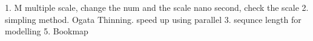 1. M multiple scale, change the num 
and the scale nano second, check the scale
2. simpling method. Ogata Thinning. speed up using parallel
3. sequnce length for modelling
5. Bookmap
